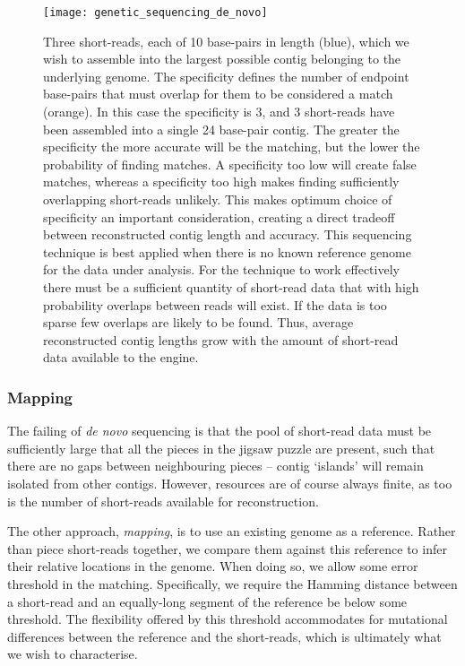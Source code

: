 \begin{figure}[!htb]
	\texttt{[image: genetic\_sequencing\_de\_novo]}
	\caption{Three short-reads, each of 10 base-pairs in length (blue), which we wish to assemble into the largest possible contig belonging to the underlying genome. The specificity defines the number of endpoint base-pairs that must overlap for them to be considered a match (orange). In this case the specificity is 3, and 3 short-reads have been assembled into a single 24 base-pair contig. The greater the specificity the more accurate will be the matching, but the lower the probability of finding matches. A specificity too low will create false matches, whereas a specificity too high makes finding sufficiently overlapping short-reads unlikely. This makes optimum choice of specificity an important consideration, creating a direct tradeoff between reconstructed contig length and accuracy. This sequencing technique is best applied when there is no known reference genome for the data under analysis. For the technique to work effectively there must be a sufficient quantity of short-read data that with high probability overlaps between reads will exist. If the data is too sparse few overlaps are likely to be found. Thus, average reconstructed contig lengths grow with the amount of short-read data available to the engine.} \label{fig:gen_seq_de_novo}
\end{figure}

%
%

\subsubsection{Mapping}

The failing of \textit{de novo} sequencing is that the pool of short-read data must be sufficiently large that all the pieces in the jigsaw puzzle are present, such that there are no gaps between neighbouring pieces -- contig `islands' will remain isolated from other contigs. However, resources are of course always finite, as too is the number of short-reads available for reconstruction.

The other approach, \textit{mapping}, is to use an existing genome as a reference. Rather than piece short-reads together, we compare them against this reference to infer their relative locations in the genome. When doing so, we allow some error threshold in the matching. Specifically, we require the Hamming distance between a short-read and an equally-long segment of the reference be below some threshold. The flexibility offered by this threshold accommodates for mutational differences between the reference and the short-reads, which is ultimately what we wish to characterise.

